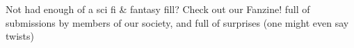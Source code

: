 Not had enough of a sci fi \& fantasy fill? Check out our Fanzine! full of submissions by members of our society, and full of surprises (one might even say twists)